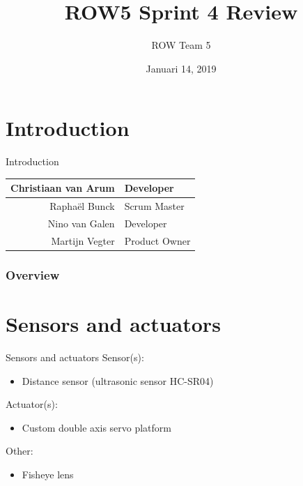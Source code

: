 \documentclass{beamer}
\title[Sprint Review]{ROW5 Sprint 4 Review}
\author{ROW Team 5}
\institute[HvA]
{
	Amsterdam University of Applied Sciences \\
	\textit{https://rescueonwheels.github.io/}
}
\date{Januari 14, 2019}
\begin{document}
\begin{frame}
\titlepage
\end{frame}

\section{Introduction}
\begin{frame}{Introduction}
    \begin{center}
        \begin{tabular}{r|l}
             Christiaan van Arum & Developer \\
             \hline
             Rapha\"{e}l Bunck & Scrum Master \\
             \hline
             Nino van Galen & Developer \\
             \hline
             Martijn Vegter & Product Owner
         \end{tabular}
    \end{center}
\end{frame}

\begin{frame}
\frametitle{Overview}
\tableofcontents
\end{frame}

\section{Sensors and actuators}
\begin{frame}{Sensors and actuators}
	Sensor(s):
	\begin{itemize}
		\item Distance sensor (ultrasonic sensor HC-SR04)
	\end{itemize}
	
	Actuator(s):
	\begin{itemize}
		\item Custom double axis servo platform
	\end{itemize}
	
	Other:
	\begin{itemize}
		\item Fisheye lens
	\end{itemize}
\end{frame}
\end{document}
